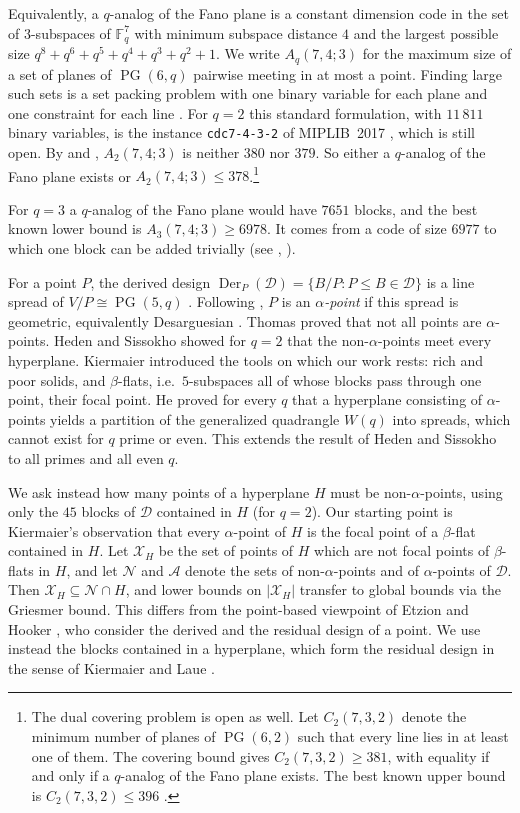 \documentclass[11pt]{amsart}
\theoremstyle{definition}
\newcommand{\F}{\mathbb{F}}
\newcommand{\D}{\mathcal{D}}
\newcommand{\X}{\mathcal{X}}
\newcommand{\N}{\mathcal{N}}
\newcommand{\A}{\mathcal{A}}
\newcommand{\PG}{\operatorname{PG}}
\newcommand{\Der}{\operatorname{Der}}
\begin{document}
Equivalently, a $q$-analog of the Fano plane is a constant dimension code in the set of $3$-subspaces of $\F_q^7$ with minimum subspace distance $4$ and the largest possible size $q^8+q^6+q^5+q^4+q^3+q^2+1$. We write $A_q(7,4;3)$ for the maximum size of a set of planes of $\PG(6,q)$ pairwise meeting in at most a point. Finding large such sets is a set packing problem with one binary variable for each plane and one constraint for each line \cite{KK08}. For $q=2$ this standard formulation, with $11\,811$ binary variables, is the instance \texttt{cdc7-4-3-2} of MIPLIB~2017 \cite{GHG+21}, which is still open. By \cite{NS16} and \cite[Section~12]{Kur25}, $A_2(7,4;3)$ is neither $380$ nor $379$. So either a $q$-analog of the Fano plane exists or $A_2(7,4;3)\le378$.\footnote{The dual covering problem is open as well. Let $C_2(7,3,2)$ denote the minimum number of planes of $\PG(6,2)$ such that every line lies in at least one of them. The covering bound gives $C_2(7,3,2)\ge 381$, with equality if and only if a $q$-analog of the Fano plane exists. The best known upper bound is $C_2(7,3,2)\le 396$ \cite[Thm.~14]{Etz14}.}

For $q=3$ a $q$-analog of the Fano plane would have $7651$ blocks, and the best known lower bound is $A_3(7,4;3)\ge6978$. It comes from a code of size $6977$ \cite{HK16} to which one block can be added trivially (see \cite{HKKW16}, \cite[footnote~1]{Kie22}).

For a point $P$, the derived design $\Der_P(\D)=\{B/P: P\le B\in\D\}$ is a line spread of $V/P\cong\PG(5,q)$ \cite[Sect.~2.2]{Kie22}. Following \cite{HS16,Kie22}, $P$ is an \emph{$\alpha$-point} if this spread is geometric, equivalently Desarguesian \cite{BC74}. Thomas \cite{Tho96} proved that not all points are $\alpha$-points. Heden and Sissokho \cite{HS16} showed for $q=2$ that the non-$\alpha$-points meet every hyperplane. Kiermaier \cite{Kie22} introduced the tools on which our work rests: rich and poor solids, and $\beta$-flats, i.e.\ $5$-subspaces all of whose blocks pass through one point, their focal point. He proved for every $q$ that a hyperplane consisting of $\alpha$-points yields a partition of the generalized quadrangle $W(q)$ into spreads, which cannot exist for $q$ prime or even. This extends the result of Heden and Sissokho to all primes and all even $q$.

We ask instead how many points of a hyperplane $H$ must be non-$\alpha$-points, using only the $45$ blocks of $\D$ contained in $H$ (for $q=2$). Our starting point is Kiermaier's observation that every $\alpha$-point of $H$ is the focal point of a $\beta$-flat contained in $H$. Let $\X_H$ be the set of points of $H$ which are not focal points of $\beta$-flats in $H$, and let $\N$ and $\A$ denote the sets of non-$\alpha$-points and of $\alpha$-points of $\D$. Then $\X_H\subseteq\N\cap H$, and lower bounds on $|\X_H|$ transfer to global bounds via the Griesmer bound. This differs from the point-based viewpoint of Etzion and Hooker \cite{EH18}, who consider the derived and the residual design of a point. We use instead the blocks contained in a hyperplane, which form the residual design in the sense of Kiermaier and Laue \cite{KL15}.
\end{document}
